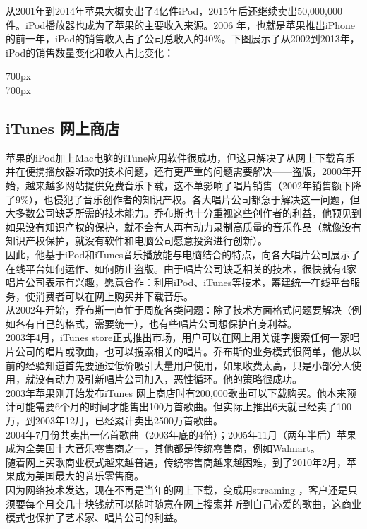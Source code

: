 从2001年到2014年苹果大概卖出了4亿件iPod，2015年后还继续卖出50,000,000件。iPod播放器也成为了苹果的主要收入来源。2006
年，也就是苹果推出iPhone的前一年，iPod的销售收入占了公司总收入的40\%。下图展示了从2002到2013年，iPod的销售数量变化和收入占比变化：

\href{文件:AppleRiseFall2Screenshot_2023-12-06_211906.jpg}{700px}\\
\href{文件:AppleRiseFallDrawScreenshot_2023-12-06_211749.jpg}{700px}

\hypertarget{itunes-ux7f51ux4e0aux5546ux5e97}{%
\subsection{iTunes 网上商店}\label{itunes-ux7f51ux4e0aux5546ux5e97}}

苹果的iPod加上Mac电脑的iTune应用软件很成功，但这只解决了从网上下载音乐并在便携播放器听歌的技术问题，还有更严重的问题需要解决------盗版，2000年开始，越来越多网站提供免费音乐下载，这不单影响了唱片销售（2002年销售额下降了9\%），也侵犯了音乐创作者的知识产权。各大唱片公司都急于解决这一问题，但大多数公司缺乏所需的技术能力。乔布斯也十分重视这些创作者的利益，他预见到如果没有知识产权的保护，就不会有人再有动力录制高质量的音乐作品（就像没有知识产权保护，就没有软件和电脑公司愿意投资进行创新）。\\
因此，他基于iPod和iTunes音乐播放能与电脑结合的特点，向各大唱片公司展示了在线平台如何运作、如何防止盗版。由于唱片公司缺乏相关的技术，很快就有4家唱片公司表示有兴趣，愿意合作：利用iPod、iTunes等技术，筹建统一在线平台服务，使消费者可以在网上购买并下载音乐。\\
从2002年开始，乔布斯一直忙于周旋各类问题：除了技术方面格式问题要解决（例如各有自己的格式，需要统一），也有些唱片公司想保护自身利益。\\
2003年4月，iTunes
store正式推出市场，用户可以在网上用关键字搜索任何一家唱片公司的唱片或歌曲，也可以搜索相关的唱片。乔布斯的业务模式很简单，他从以前的经验知道首先要通过低价吸引大量用户使用，如果收费太高，只是小部分人使用，就没有动力吸引新唱片公司加入，恶性循环。他的策略很成功。\\
2003年苹果刚开始发布iTunes
网上商店时有200,000歌曲可以下载购买。他本来预计可能需要6个月的时间才能售出100万首歌曲。但实际上推出6天就已经卖了100万，到2003年12月，已经累计卖出2500万首歌曲。\\
2004年7月份共卖出一亿首歌曲（2003年底的4倍）；2005年11月（两年半后）苹果成为全美国十大音乐零售商之一，其他都是传统零售商，例如Walmart。\\
随着网上买歌商业模式越来越普遍，传统零售商越来越困难，到了2010年2月，苹果成为美国最大的音乐零售商。\\
因为网络技术发达，现在不再是当年的网上下载，变成用streaming
，客户还是只须要每个月交几十块钱就可以随时随意在网上搜索并听到自己心爱的歌曲，这商业模式也保护了艺术家、唱片公司的利益。

